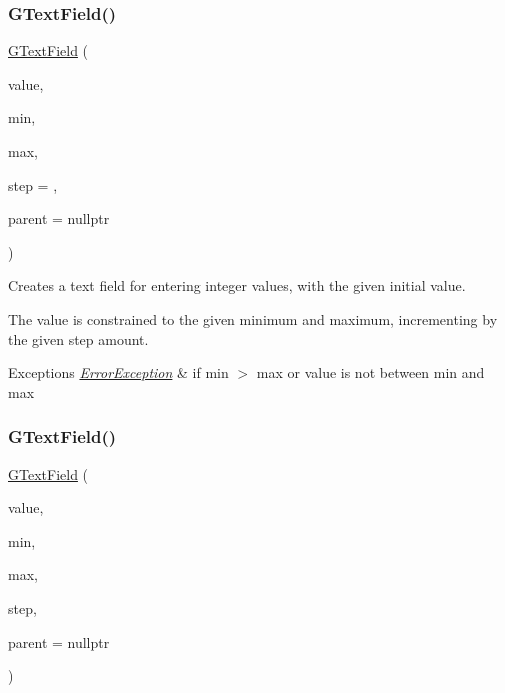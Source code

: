 \subsubsection{\texorpdfstring{G\+Text\+Field()}{GTextField()}\hspace{0.1cm}{\footnotesize\ttfamily [3/4]}}
{\footnotesize\ttfamily \mbox{\hyperlink{classGTextField}{G\+Text\+Field}} (\begin{DoxyParamCaption}\item[{int}]{value,  }\item[{int}]{min,  }\item[{int}]{max,  }\item[{int}]{step = {},  }\item[{Q\+Widget $\ast$}]{parent = {\ttfamily nullptr} }\end{DoxyParamCaption})}



Creates a text field for entering integer values, with the given initial value. 

The value is constrained to the given minimum and maximum, incrementing by the given step amount. 
\begin{DoxyExceptions}{Exceptions}
{\em \mbox{\hyperlink{classErrorException}{Error\+Exception}}} & if min $>$ max or value is not between min and max \\
\hline
\end{DoxyExceptions}
\mbox{\label{classGTextField_a8d164bf18d4dd4da6d5af0d23ee3a2c8}} 
\subsubsection{\texorpdfstring{G\+Text\+Field()}{GTextField()}\hspace{0.1cm}{\footnotesize\ttfamily [4/4]}}
{\footnotesize\ttfamily \mbox{\hyperlink{classGTextField}{G\+Text\+Field}} (\begin{DoxyParamCaption}\item[{double}]{value,  }\item[{double}]{min,  }\item[{double}]{max,  }\item[{double}]{step,  }\item[{Q\+Widget $\ast$}]{parent = {\ttfamily nullptr} }\end{DoxyParamCaption})}



